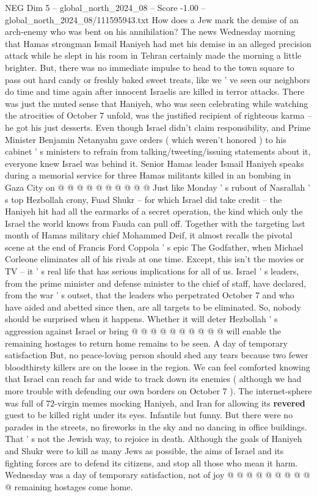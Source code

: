 \begin{textsample}{NEG Dim 5 – global\_north\_2024\_08 – Score -1.00 – global\_north\_2024\_08/111595943.txt}  \label{ex:f5_neg_060}
How does a Jew mark the demise of an arch-enemy who was bent on his annihilation?
The news Wednesday morning that Hamas strongman Ismail Haniyeh had met his demise in an alleged precision attack while he slept in his room in Tehran certainly made the morning a little brighter.
But, there was no immediate impulse to head to the town square to pass out hard candy or freshly baked sweet treats, like we ' ve seen our neighbors do time and time again after innocent Israelis are killed in terror attacks.
There was just the muted sense that Haniyeh, who was seen celebrating while watching the atrocities of October 7 unfold, was the justified recipient of righteous karma -- he got his just desserts.
Even though Israel didn't claim responsibility, and Prime Minister Benjamin Netanyahu gave orders ( which weren't honored ) to his cabinet ' s ministers to refrain from talking/tweeting/issuing statements about it, everyone knew Israel was behind it.
Senior Hamas leader Ismail Haniyeh speaks during a memorial service for three Hamas militants killed in an bombing in Gaza City on @ @ @ @ @ @ @ @ @ @ Just like Monday ' s rubout of Nasrallah ' s top Hezbollah crony, Fuad Shukr -- for which Israel did take credit -- the Haniyeh hit had all the earmarks of a secret operation, the kind which only the Israel the world knows from Fauda can pull off.
Together with the targeting last month of Hamas military chief Mohammed Deif, it almost recalls the pivotal scene at the end of Francis Ford Coppola ' s epic The Godfather, when Michael Corleone eliminates all of his rivals at one time.
Except, this isn't the movies or TV -- it ' s real life that has serious implications for all of us.
Israel ' s leaders, from the prime minister and defense minister to the chief of staff, have declared, from the war ' s outset, that the leaders who perpetrated October 7 and who have aided and abetted since then, are all targets to be eliminated.
So, nobody should be surprised when it happens.
Whether it will deter Hezbollah ' s aggression against Israel or bring @ @ @ @ @ @ @ @ @ @ will enable the remaining hostages to return home remains to be seen.
A day of temporary satisfaction But, no peace-loving person should shed any tears because two fewer bloodthirsty killers are on the loose in the region.
We can feel comforted knowing that Israel can reach far and wide to track down its enemies ( although we had more trouble with defending our own borders on October 7 ).
The internet-sphere was full of 72-virgin memes mocking Haniyeh, and Iran for allowing its \textbf{revered} guest to be killed right under its eyes.
Infantile but funny.
But there were no parades in the streets, no fireworks in the sky and no dancing in office buildings.
That ' s not the Jewish way, to rejoice in death.
Although the goals of Haniyeh and Shukr were to kill as many Jews as possible, the aims of Israel and its fighting forces are to defend its citizens, and stop all those who mean it harm.
Wednesday was a day of temporary satisfaction, not of joy @ @ @ @ @ @ @ @ @ @ remaining hostages come home.

\end{textsample}
